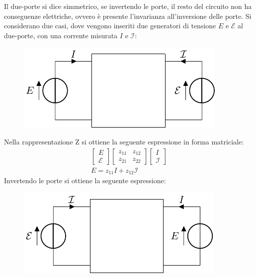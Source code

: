 \documentclass{article}
\numberwithin{equation}{subsection}
\begin{document}
Il due-porte si dice simmetrico, se invertendo le porte, il resto del circuito non ha conseguenze elettriche, ovvero è presente l'invarianza all'inversione delle porte. 
Si considerano due casi, dove vengono inseriti due generatori di tensione $E$ e $\mathcal{E}$ al due-porte, con una corrente misurata $I$ e $\mathcal{I}$:
\begin{figure}[ht]%
    \centering
    \includegraphics{due-porte-entrate.pdf}
    \label{fig:due-porte-forzanti}
\end{figure}

Nella rappresentazione Z si ottiene la seguente espressione in forma matriciale:
\begin{gather*}
    \begin{bmatrix}
        E\\\mathcal{E}
    \end{bmatrix}\begin{bmatrix}
        z_{11}&z_{12}\\z_{21}&z_{22}
    \end{bmatrix}\begin{bmatrix}
        I\\\mathcal{I}
    \end{bmatrix}\\
    E=z_{11}I+z_{12}\mathcal{I}
\end{gather*}
Invertendo le porte si ottiene la seguente espressione:
\begin{figure}[ht]%
    \centering
    \includegraphics{due-porte-entrate-invertite.pdf}
    \label{fig:due-porte-forzanti-invertite}
\end{figure}
\end{document}
